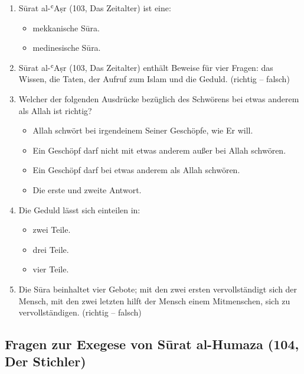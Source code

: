 \begin{enumerate}[leftmargin=1.6em,resume]
\item Sūrat al-ʿAṣr (103, Das Zeitalter) ist eine:
  \begin{itemize}
    \item mekkanische Sūra. \item medinesische Sūra.
  \end{itemize}
\item Sūrat al-ʿAṣr (103, Das Zeitalter) enthält Beweise für vier Fragen: das Wissen, die Taten,
  der Aufruf zum Islam und die Geduld. (richtig -- falsch)
\item Welcher der folgenden Ausdrücke bezüglich des Schwörens bei etwas anderem als Allah ist
  richtig?
  \begin{itemize}
    \item Allah schwört bei irgendeinem Seiner Geschöpfe, wie Er will.
    \item Ein Geschöpf darf nicht mit etwas anderem außer bei Allah schwören.
    \item Ein Geschöpf darf bei etwas anderem als Allah schwören.
    \item Die erste und zweite Antwort.
  \end{itemize}
\item Die Geduld lässt sich einteilen in:
  \begin{itemize}
    \item zwei Teile. \item drei Teile. \item vier Teile.
  \end{itemize}
\item Die Sūra beinhaltet vier Gebote; mit den zwei ersten vervollständigt sich der Mensch, mit
  den zwei letzten hilft der Mensch einem Mitmenschen, sich zu vervollständigen.
  (richtig -- falsch)
\end{enumerate}

\subsection*{Fragen zur Exegese von Sūrat al-Humaza (104, Der Stichler)}

